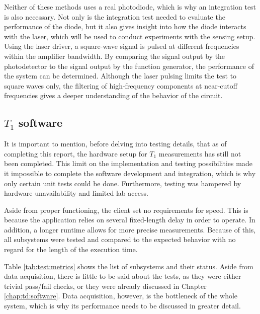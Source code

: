 Neither of these methods uses a real photodiode, which is why an integration test is also necessary. Not only is the integration test needed to evaluate the performance of the diode, but it also gives insight into how the diode interacts with the laser, which will be used to conduct experiments with the sensing setup. Using the laser driver, a square-wave signal is pulsed at different frequencies within the amplifier bandwidth. By comparing the signal output by the photodetector to the signal output by the function generator, the performance of the system can be determined. Although the laser pulsing limits the test to square waves only, the filtering of high-frequency components at near-cutoff frequencies gives a deeper understanding of the behavior of the circuit.

\subsection{$T_1$ software}
It is important to mention, before delving into testing details, that as of completing this report, the hardware setup for $T_1$ measurements has still not been completed. This limit on the implementation and testing possibilities made it impossible to complete the software development and integration, which is why only certain unit tests could be done. Furthermore, testing was hampered by hardware unavailability and limited lab access.

Aside from proper functioning, the client set no requirements for speed. This is because the application relies on several fixed-length delay in order to operate. In addition, a longer runtime allows for more precise measurements. Because of this, all subsystems were tested and compared to the expected behavior with no regard for the length of the execution time.

Table \ref{tab:test:metrics} shows the list of subsystems and their status. Aside from data acquisition, there is little to be said about the tests, as they were either trivial pass/fail checks, or they were already discussed in Chapter \ref{chap:td:software}. Data acquisition, however, is the bottleneck of the whole system, which is why its performance needs to be discussed in greater detail.



